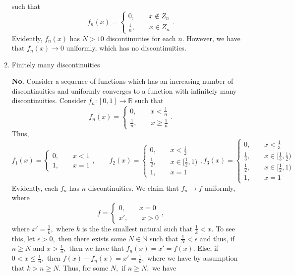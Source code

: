 \documentclass[11pt]{article}
\newcommand{\bbN}{\mathbb{N}}
\newcommand{\bbR}{\mathbb{R}}
\begin{document}
\begin{enumerate}
\begin{solution}
        such that 
        \[f_n(x) = 
        \begin{cases}
            0, \qquad x\notin Z_n\\
            \frac{1}{n}, \qquad x\in Z_n
        \end{cases}.\] Evidently, $f_n(x)$ has $N>10$ discontinuities for each $n.$ However, we have that $f_n(x) \to 0$ uniformly, which has no discontinuities.
    \end{solution}
    \item 
    \begin{problem}
        Finitely many discontinuities
    \end{problem}
    \begin{solution}
        \textbf{No.} Consider a sequence of functions which has an increasing number of discontinuities and uniformly converges to a function with infinitely many discontinuities. Consider $f_n: [0,1] \to \bbR$ such that 
        \[f_n(x) = 
        \begin{cases}
            0, \qquad x < \frac{1}{n}\\
            \frac{1}{n}, \qquad x \geq \frac{1}{n}
        \end{cases}.\]
        Thus, 
        \[f_1(x) = 
        \begin{cases}
            0, \qquad x < 1\\
            1, \qquad x = 1
        \end{cases}, 
        \qquad f_2(x) = 
        \begin{cases}
            0, \qquad x <\frac{1}{2}\\
            \frac{1}{2}, \qquad x\in [\frac{1}{2}, 1)\\
            1, \qquad x = 1
        \end{cases}, 
        f_3(x) =
        \begin{cases}
            0, \qquad x< \frac{1}{3}\\
            \frac{1}{3}, \qquad x \in [\frac{1}{3}, \frac{1}{2})\\
            \frac{1}{2}, \qquad x \in [\frac{1}{2}, 1)\\
            1, \qquad x = 1
        \end{cases}\]
        Evidently, each $f_n$ has $n$ discontinuities. We claim that $f_n \to f$ uniformly, where 
        \[f = \begin{cases}
            0,\qquad x = 0\\
            x', \qquad x>0
        \end{cases},\] where $x' = \frac{1}{k},$ where $k$ is the the smallest natural such that $\frac{1}{k}< x.$ To see this, let $\epsilon>0,$ then there exists some $N \in \bbN$ such that $\frac{1}{N}< \epsilon$ and thus, if $n\geq N$ and $x> \frac{1}{n},$ then we have that $f_n(x) = x' = f(x).$ Else, if $0< x\leq \frac{1}{n},$ then $f(x) - f_n(x) = x' = \frac{1}{k},$ where we have by assumption that $k>n \geq N.$ Thus, for some $N,$ if $n\geq N,$ we have

\end{solution}
\end{enumerate}
\end{document}
